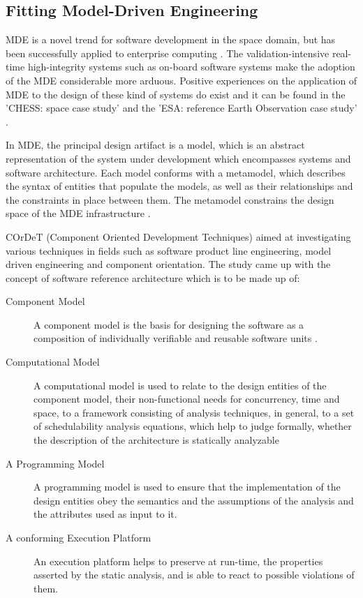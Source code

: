 \subsection{Fitting Model-Driven Engineering}
MDE is a novel trend for software development in the space domain, but has been successfully applied to enterprise computing \cite{CompBasedDev}. The validation-intensive real-time high-integrity systems such as on-board software systems make the adoption of the MDE considerable more arduous. Positive experiences on the application of MDE to the design of these kind of systems do exist and it can be found in the 'CHESS: space case study' \cite{CompBasedProcess} and the 'ESA: reference Earth Observation case study' \cite{CompBasedProcess}.

In MDE, the principal design artifact is a model, which is an abstract representation of the system under development which encompasses systems and software architecture. Each model conforms with a metamodel, which describes the syntax of entities that populate the models, as well as their relationships and the constraints in place between them. The metamodel constrains the design space of the MDE infrastructure \cite{Metamodelling}.  

COrDeT (Component Oriented Development Techniques) aimed at investigating various techniques in fields such as software product line engineering, model driven engineering and component orientation. The study came up with the concept of software reference architecture which is to be made up of: \cite{CORDET,SoftRefArch,SAVOIR}

\begin{description}
\item [Component Model] A component model is the basis for designing the software as a composition of individually verifiable and reusable software units \cite{ComponentModel}.

\item [Computational Model] A computational model is used to relate to the design entities of the component model, their non-functional needs for concurrency, time and space, to a framework consisting of analysis techniques, in general, to a set of schedulability analysis equations, which help to judge formally, whether the description of the architecture is statically analyzable \cite{ScheduAnaly}

\item [A Programming Model] A programming model is used to ensure that the implementation of the design entities obey the semantics and the assumptions of the analysis and the attributes used as input to it.\cite{CharEvoRAVCodeAr}

\item [A conforming Execution Platform] An execution platform helps to preserve at run-time, the properties asserted by the static analysis, and is able to react to possible violations of them.  
\end{description}

